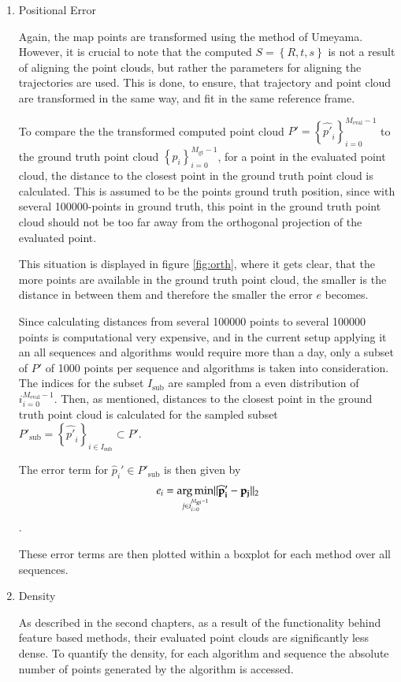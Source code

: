 	\begin{enumerate}
	\item{Positional Error}
	
	Again, the map points are transformed using the method of Umeyama. However, it is crucial to note that the computed 
	$S = \left\{R,t,s\right\}$ is not a result of aligning the point clouds, but rather the parameters for aligning the trajectories 
	are used. This is done, to ensure, that trajectory and point cloud are transformed in the same way, and fit in the same reference frame. 
	
	To compare the the transformed computed point cloud $P' = \left\{{\widehat{p'}_i}\right\}_{i=0}^{M_{\text{eval}}-1}$ to the ground truth point cloud
	$\left\{p_i\right\}_{i=0}^{M_{\text{gt}}-1}$, for a point in the evaluated point cloud, the distance to the closest point in the ground truth
	point cloud is calculated. This is assumed to be the points ground truth position, since with several 100000-points in ground truth, this point in 
	the ground truth point cloud should not be too far away from the orthogonal projection of the evaluated point. 
	
	
	This situation is displayed in figure \ref{fig:orth}, where it gets clear, that the more points are available in the ground truth point cloud, 
	the smaller is the distance in between them and therefore the smaller the error $e$ becomes.

	Since calculating distances from several 100000 points to several 100000 points is computational very expensive, and in the current setup applying 
	it an all sequences and algorithms would require more than a day, only a subset of $P'$ of 1000 points per sequence and algorithms
	is taken into consideration. The indices for the subset $I_{\text{sub}}$ are sampled from a even distribution of ${i}_{i = 0}^{M_{\text{eval}}-1}$. 
	Then, as mentioned, distances to the closest point in the ground truth point cloud is calculated for the sampled subset 
	$P'_{\text{sub}} = \left\{{\widehat{p'}_i}\right\}_{i \in I_{\text{sub}}} \subset P'$. 
	
	The error term for $\widehat{p}_i' \in P'_{\text{sub}}$ is then given by
	$$ e_i = \mathop{\mathrm{arg\,min}}_{j \in {i}_{i=0}^{M_{\text{gt}}-1}} \lVert \mathbf{\widehat{p}_i' - p_j} \rVert_2 $$.
	
	These error terms are then plotted within a boxplot for each method over all sequences. 
	
	\item{Density}
	
	As described in the second chapters, as a result of the functionality behind feature based methods, their evaluated point clouds are 
	significantly less dense. To quantify the density, for each algorithm and sequence the absolute number of points generated by the 
	algorithm is accessed. 
	
	\end{enumerate}
	
